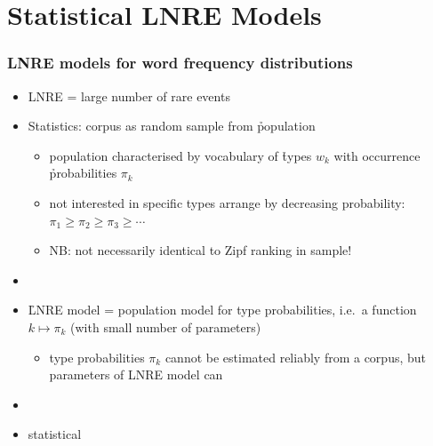 \documentclass[t]{beamer} %
\begin{document}
\section{Statistical LNRE Models}

\begin{frame}
  \frametitle{LNRE models for word frequency distributions}

  \begin{itemize}
  \item LNRE = large number of rare events \citep[cf.][]{Baayen:01}
  \item Statistics: corpus as random sample from \h{population}
    \begin{itemize}
    \item population characterised by vocabulary of \h{types} $w_k$ with
      occurrence \h{probabilities} $\pi_k$
    \item not interested in specific types \so arrange by decreasing
      probability: $\pi_1\geq \pi_2\geq \pi_3 \geq \cdots$
    \item NB: not necessarily identical to Zipf ranking in sample!
    \end{itemize}
  \item[]\pause
  \item \h{LNRE model} = population model for type probabilities, i.e.\ a
    function $k \mapsto \pi_k$ (with small number of parameters)
    \begin{itemize}
    \item type probabilities $\pi_k$ cannot be estimated reliably from a
      corpus, but parameters of LNRE model can
    \end{itemize}
  \item[]\pause
  \item[\So]  statistical 
  \end{itemize}
\end{frame}
\end{document}
